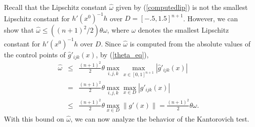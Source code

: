 \documentclass{article}
\newcommand{\norm}[1]{\left\|#1\right\|} \newcommand{\norma}[1]{\left\|#1\right\|}   \newcommand{\inv}[1]{#1^{-1}}
\begin{document}
Recall that the Lipschitz constant $\hat{\omega}$ given by
(\ref{computedlip}) is not the smallest Lipschitz constant for
$\inv{h'(x^0)}h$ over $D=[-.5,1.5]^{n+1}$. However, we
can show that $\hat{\omega} \leq \left((n+1)^2/2\right)\theta\omega$, where $\omega$
denotes the smallest Lipschitz constant for $\inv{h'(x^0)}h$ over
$D$. Since $\hat{\omega}$ is computed from the absolute values of
the control points of $\hat{g}'_{ijk}(x)$, by (\ref{theta_eq}),
\begin{eqnarray}
\hat{\omega} & \leq & \frac{(n+1)^2}{2} \theta \max_{i,j,k}\max_{x \in [0,1]^{n+1}} \left|\hat{g}'_{ijk}(x) \right| \nonumber \\
& = & \frac{(n+1)^2}{2}\theta \max_{i,j,k}\max_{x \in D} \left|g'_{ijk}(x) \right| 
 \nonumber \\
& \leq & \frac{(n+1)^2}{2}\theta \max_{x \in D} \norm{g'(x)} = \frac{(n+1)^2}{2}\theta\omega.
\label{hodef}
\end{eqnarray}
With this bound on $\hat{\omega}$, we can now analyze the behavior of the Kantorovich test.  
\end{document}
